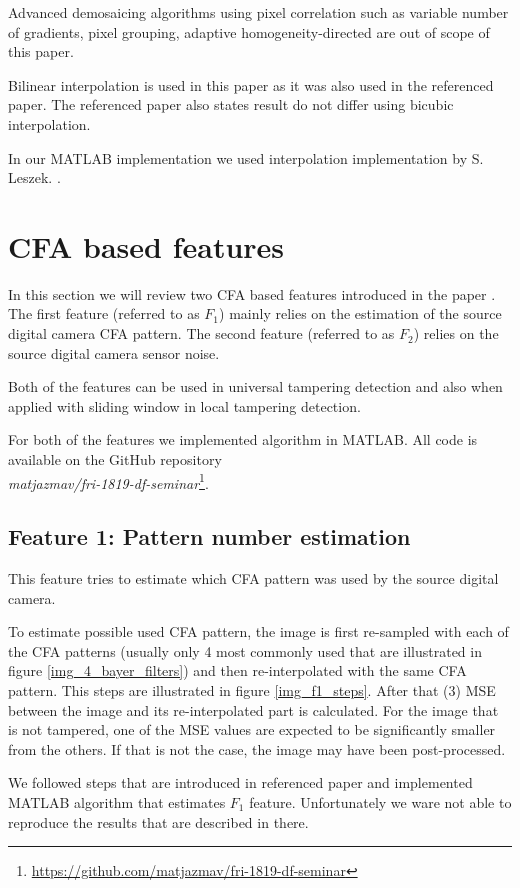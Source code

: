 \documentclass{template/acm_proc_article-sp}
\begin{document}
Advanced demosaicing algorithms using pixel correlation such as 
variable number of gradients, pixel grouping, adaptive homogeneity-directed
are out of scope of this paper.

Bilinear interpolation is used in this paper as it was also used in
the referenced paper. The referenced paper also states result do not
differ using bicubic interpolation.

In our MATLAB implementation we used interpolation implementation by S. Leszek. \cite{cfainterpolation2009}.

\newpage
\section{CFA based features}
In this section we will review two CFA based features introduced in the paper \cite{dirik2009image}. The first feature (referred to as  $F_1$) mainly relies on the estimation of the source digital camera CFA pattern. The second feature (referred to as $F_2$) relies on the source digital camera sensor noise.

Both of the features can be used in universal tampering detection and also when applied with sliding window in local tampering detection.

For both of the features we implemented algorithm in MATLAB. All code is available on the GitHub repository\\\textit{matjazmav/fri-1819-df-seminar}\footnote{\url{https://github.com/matjazmav/fri-1819-df-seminar}}.

\subsection{Feature 1: Pattern number estimation}
This feature tries to estimate which CFA pattern was used by the source digital camera.

To estimate possible used CFA pattern, the image is first re-sampled with each of the CFA patterns (usually only 4 most commonly used that are illustrated in figure \ref{img_4_bayer_filters}) and then re-interpolated with the same CFA pattern. This steps are illustrated in figure \ref{img_f1_steps}. After that (3) MSE between the image and its re-interpolated part is calculated. For the image that is not tampered, one of the MSE values are expected to be significantly smaller from the others. If that is not the case, the image may have been post-processed.

We followed steps that are introduced in referenced paper and implemented MATLAB algorithm that estimates $F_1$ feature. Unfortunately we ware not able to reproduce the results that are described in there.
\end{document}
